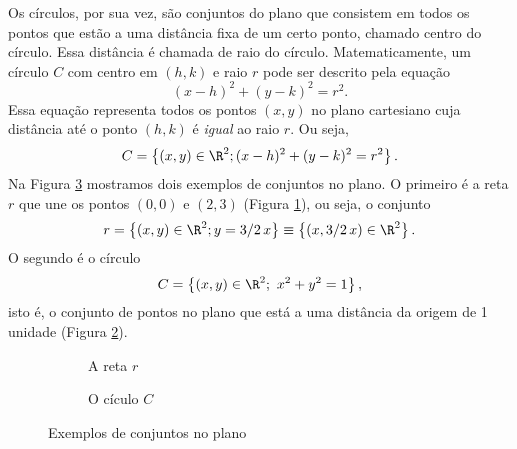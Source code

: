 \pagebreak

Os círculos, por sua vez, são conjuntos do plano que consistem em todos os pontos que estão a uma distância fixa de um certo ponto, chamado centro do círculo. Essa distância é chamada de raio do círculo. Matematicamente, um círculo $C$ com centro em $(h,k)$ e raio $r$ pode ser descrito pela equação
\begin{equation}\label{eq:circulo}
    (x - h)^2 + (y - k)^2 = r^2.
\end{equation}
Essa equação representa todos os pontos $(x,y)$ no plano cartesiano cuja distância até o ponto $(h,k)$ é \textit{igual} ao raio $r$. Ou seja, 
$$C=\left\{(x,y)\in\R^2; (x - h)^2 + (y - k)^2 = r^2 \right\}.$$
Na Figura \ref{fig:2} mostramos dois exemplos de conjuntos no plano.  
O primeiro é a reta $r$ que une os pontos $(0,0)$ e $(2,3)$ (Figura \ref{fig:2-reta_r}), ou seja, o conjunto
\[r=\left\{(x,y)\in \R^2; y=3/2\,x\right\}\equiv \left\{(x,3/2\,x)\in \R^2\right\}.\]
O segundo é o círculo 
$$C=\left\{(x,y)\in\R^2;~x^2+y^2=1\right\},$$
isto é, o conjunto de pontos no plano que está a uma distância da origem de 1 unidade (Figura \ref{fig:2-circulo}). 
\begin{figure}[!htb]
  \centering
  \begin{subfigure}{0.4\textwidth}
    \centering
{}
    \caption{A reta $r$}
    \label{fig:2-reta_r}
  \end{subfigure}
  \hfill
\begin{subfigure}{0.4\textwidth}
    \centering
{}
    \caption{O cículo $C$}
    \label{fig:2-circulo}
  \end{subfigure}
  \caption{Exemplos de conjuntos no plano}
  \label{fig:2}
\end{figure}


